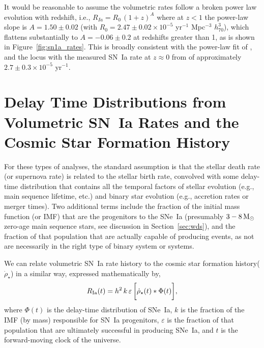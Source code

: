 \documentclass[apj]{aastex62}
\begin{document}
It would be reasonable to assume the volumetric rates follow a broken power law evolution with redshift, i.e., $R_{Ia}=R_0\,(1+z)^A$ where at $z<1$ the power-law slope is $A=1.50\pm0.02$ (with $R_0 = 2.47\pm0.02\times10^{-5}$ yr$^{-1}$ Mpc$^{-3}$ $h_{70}^3$), which flattens substantially to $A=-0.06\pm0.2$ at redshifts greater than 1, as is shown in  Figure~\ref{fig:sn1a_rates}. This is broadly consistent with the power-law fit of \cite{Okumura:2014}, and the locus with the measured SN~Ia rate at $z\approx0$ from \cite{Li:2011b} of approximately $2.7\pm0.3\times10^{-5}$ yr$^{-1}$. 


\section{Delay Time Distributions from Volumetric SN~Ia Rates and the Cosmic Star Formation History}

For these types of analyses, the standard assumption is that the stellar death rate (or supernova rate) is related to the stellar birth rate, convolved with some delay-time distribution that contains all the temporal factors of stellar evolution (e.g., main sequence lifetime, etc.) and binary star evolution (e.g., accretion rates or merger times). Two additional terms include the fraction of the initial mass function (or IMF) that are the progenitors to the SNe~Ia (presumably $3 - 8\, \rm{M}_{\odot}$ zero-age main sequence stars, see discussion in Section~\ref{sec:wds}), and the fraction of that population that are actually capable of producing events, as not are necessarily in the right type of binary system or systems.

We can relate volumetric SN~Ia rate history to the cosmic star formation history($\dot{\rho}_{\star}$) in a similar way, expressed mathematically by, 
\begin{equation}
R_{\rm Ia}(t) =  h^2\,k\,\varepsilon\,\biggl[\dot{\rho}_{\star}(t) \ast \Phi(t)\biggr],
\label{eqn:std}
\end{equation}
\noindent where $\Phi(t)$ is the delay-time distribution of SNe~Ia, $k$ is the fraction of the IMF (by mass) responsible for SN~Ia progenitors, $\varepsilon$ is the fraction of that population that are ultimately successful in producing SNe~Ia, and $t$ is the forward-moving clock of the universe. 
\end{document}
